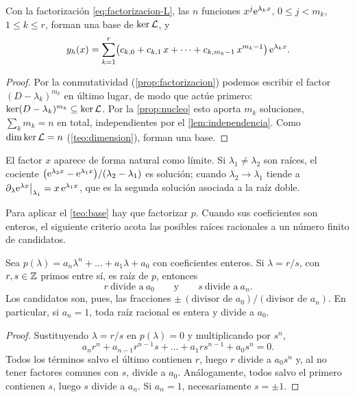 \begin{teorema}\label{teo:base}
Con la factorización \eqref{eq:factorizacion-L}, las $n$ funciones
$x^{j}\mathrm{e}^{\lambda_kx}$, $0\le j<m_k$, $1\le k\le r$, forman una base de
$\operatorname{ker}\mathcal{L}$, y
\begin{equation}\label{eq:yh-general}
  y_h(x)=\sum_{k=1}^{r}\bigl(c_{k,0}+c_{k,1}\,x+\dots+c_{k,m_k-1}\,x^{m_k-1}\bigr)\,\mathrm{e}^{\lambda_kx}.
\end{equation}
\end{teorema}

\begin{proof}
Por la conmutatividad (\cref{prop:factorizacion}) podemos escribir el
factor $(D-\lambda_k)^{m_k}$ en último lugar, de modo que actúe primero:
$\operatorname{ker}(D-\lambda_k)^{m_k}\subseteq\operatorname{ker}\mathcal{L}$. Por la \cref{prop:nucleo} esto
aporta $m_k$ soluciones, $\sum_km_k=n$ en total, independientes por el
\cref{lem:independencia}. Como $\dim\operatorname{ker}\mathcal{L}=n$ (\cref{teo:dimension}),
forman una base.
\end{proof}

\begin{observacion}\label{obs:proximas}
El factor $x$ aparece de forma natural como límite. Si $\lambda_1\neq\lambda_2$
son raíces, el cociente
$\bigl(\mathrm{e}^{\lambda_2x}-\mathrm{e}^{\lambda_1x}\bigr)/(\lambda_2-\lambda_1)$ es
solución; cuando $\lambda_2\to\lambda_1$ tiende a
$\partial_\lambda\mathrm{e}^{\lambda x}\big|_{\lambda_1}=x\,\mathrm{e}^{\lambda_1x}$, que es la
segunda solución asociada a la raíz doble.
\end{observacion}

Para aplicar el \cref{teo:base} hay que factorizar $p$. Cuando sus
coeficientes son enteros, el siguiente criterio acota las posibles raíces
racionales a un número finito de candidatos.

\begin{proposicion}\label{prop:raices-racionales}
Sea $p(\lambda)=a_n\lambda^{n}+\dots+a_1\lambda+a_0$ con coeficientes enteros. Si
$\lambda=r/s$, con $r,s\in\mathbb{Z}$ primos entre sí, es raíz de $p$, entonces
\[
  r\ \text{divide a}\ a_0\qquad\text{y}\qquad s\ \text{divide a}\ a_n .
\]
Los candidatos son, pues, las fracciones
$\pm\,(\text{divisor de }a_0)/(\text{divisor de }a_n)$. En particular, si
$a_n=1$, toda raíz racional es entera y divide a $a_0$.
\end{proposicion}

\begin{proof}
Sustituyendo $\lambda=r/s$ en $p(\lambda)=0$ y multiplicando por $s^{n}$,
\[
  a_nr^{n}+a_{n-1}r^{n-1}s+\dots+a_1rs^{n-1}+a_0s^{n}=0 .
\]
Todos los términos salvo el último contienen $r$, luego $r$ divide a
$a_0s^{n}$ y, al no tener factores comunes con $s$, divide a $a_0$.
Análogamente, todos salvo el primero contienen $s$, luego $s$ divide a
$a_n$. Si $a_n=1$, necesariamente $s=\pm1$.
\end{proof}


